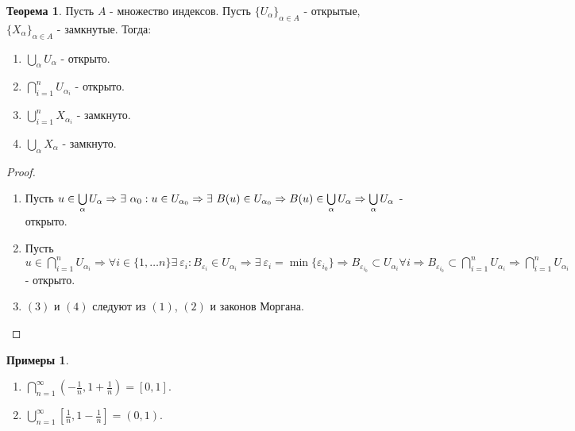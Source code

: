 \documentclass[a4paper, 12pt]{article}
\renewcommand{\epsilon}{\varepsilon}
\newcommand\tab[1][.5cm]{\hspace*{#1}}
\theoremstyle{definition}
\newtheorem*{theorem}{Теорема}
\newtheorem*{examples}{Примеры}
\begin{document}
        \begin{theorem}
            Пусть $A$ - множество индексов. Пусть $\{U_{\alpha}\}_{\alpha\in A}$ - открытые,\\
            $\{X_{\alpha}\}_{\alpha\in A}$ - замкнутые. Тогда:
            \begin{enumerate}
                \item $\bigcup\limits_{\alpha} U_{\alpha}$ - открыто.
                \item $\bigcap\limits_{i=1}^n U_{\alpha_i}$ - открыто.
                \item $\bigcup\limits_{i=1}^n X_{\alpha_i}$ - замкнуто.
                \item $\bigcup\limits_{\alpha} X_{\alpha}$ - замкнуто.
            \end{enumerate}
        \end{theorem} 
        \begin{proof} \tab
            \begin{enumerate}
                \item Пусть $u\in \bigcup\limits_{\alpha} U_{\alpha} \Rightarrow \exists\ \alpha_0: u\in U_{\alpha_0}\Rightarrow \exists\ B(u)\in U_{\alpha_0}\Rightarrow B(u)\in \bigcup\limits_{\alpha} U_{\alpha}\\
                \Rightarrow \bigcup\limits_{\alpha} U_{\alpha}$ - открыто.
                \item Пусть $u\in \bigcap\limits_{i=1}^n U_{\alpha_i} \Rightarrow \forall i\in \{1,\dots n\} \exists\ \epsilon_i: B_{\epsilon_i}\in U_{\alpha_i}\Rightarrow \exists\ \epsilon_i = \min\{\epsilon_{i_0}\}\Rightarrow B_{\epsilon_{i_0}}\subset U_{\alpha_i} \forall i \Rightarrow B_{\epsilon_{i_0}}\subset \bigcap\limits_{i=1}^n U_{\alpha_i}\Rightarrow \bigcap\limits_{i=1}^n U_{\alpha_i}$ - открыто.
                \item $(3)$ и $(4)$ следуют из $(1)$, $(2)$ и законов Моргана. 
            \end{enumerate}
        \end{proof} 
        \begin{examples} \tab
            \begin{enumerate}
                \item $\bigcap\limits_{n=1}^{\infty}(-\frac{1}{n}, 1+\frac{1}{n})=[0,1]$.
                \item $\bigcup\limits_{n=1}^{\infty}[\frac{1}{n}, 1-\frac{1}{n}]=(0,1)$.
            \end{enumerate}
        \end{examples}
\end{document}
